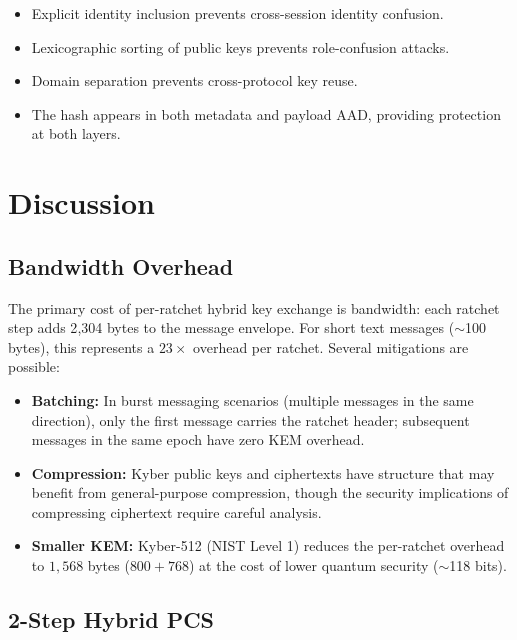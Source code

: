 \documentclass[11pt,a4paper]{article}
\theoremstyle{definition}
\begin{document}
\begin{itemize}
  \item Explicit identity inclusion prevents cross-session identity confusion.
  \item Lexicographic sorting of public keys prevents role-confusion attacks.
  \item Domain separation prevents cross-protocol key reuse.
  \item The hash appears in both metadata and payload AAD, providing protection at both layers.
\end{itemize}


\section{Discussion}\label{sec:discussion}

\subsection{Bandwidth Overhead}

The primary cost of per-ratchet hybrid key exchange is bandwidth: each ratchet step adds 2{,}304 bytes to the message envelope. For short text messages ($\sim$100 bytes), this represents a $23\times$ overhead per ratchet. Several mitigations are possible:

\begin{itemize}
  \item \textbf{Batching:} In burst messaging scenarios (multiple messages in the same direction), only the first message carries the ratchet header; subsequent messages in the same epoch have zero KEM overhead.
  \item \textbf{Compression:} Kyber public keys and ciphertexts have structure that may benefit from general-purpose compression, though the security implications of compressing ciphertext require careful analysis.
  \item \textbf{Smaller KEM:} Kyber-512 (NIST Level 1) reduces the per-ratchet overhead to $1{,}568$ bytes ($800 + 768$) at the cost of lower quantum security ($\sim$118 bits).
\end{itemize}

\subsection{2-Step Hybrid PCS}
\end{document}
